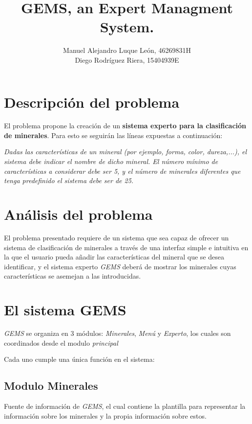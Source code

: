 \documentclass[a4paper,10pt]{article}
\title{GEMS, an Expert Managment System.}
\author{Manuel Alejandro Luque León, 46269831H\\Diego Rodríguez Riera, 15404939E}
\begin{document}
\maketitle
\pagebreak
\tableofcontents
\pagebreak

\section{Descripción del problema}
\paragraph{}El problema propone la creación de un \textbf{sistema experto para la clasificación de minerales}. Para esto se seguirán las líneas expuestas a continuación:

\textit{Dadas las características de un mineral (por ejemplo, forma, color, dureza,...), el sistema debe indicar el nombre de dicho mineral.  El número mínimo de características a considerar debe ser 5, y el número de minerales diferentes que tenga predefinido el sistema debe ser de 25.}


\section{Análisis del problema}
El problema presentado requiere de un sistema que sea capaz de ofrecer un sistema de clasificación de minerales a través de una interfaz simple e intuitiva en la que el usuario pueda añadir las características del mineral que se desea identificar, y el sistema experto \textit{GEMS} deberá de mostrar los minerales cuyas características se asemejan a las introducidas.

\pagebreak
    
\section{El sistema GEMS}
\textit{GEMS} se organiza en 3 módulos: \textit{Minerales}, \textit{Menú} y \textit{Experto}, los cuales son coordinados desde el modulo \textit{principal}

Cada uno cumple una única función en el sistema:

\subsection{Modulo Minerales}
Fuente de información de \textit{GEMS}, el cual contiene la plantilla para representar la información sobre los minerales y la propia información sobre estos.
\end{document}
